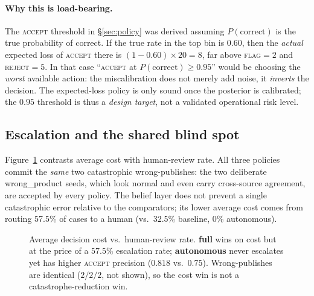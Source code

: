 \documentclass[11pt]{article}
\newcommand{\pcorrect}{P(\text{correct})}
\begin{document}
\paragraph{Why this is load-bearing.} The \textsc{accept} threshold in
\S\ref{sec:policy} was derived assuming $\pcorrect$ is the true probability of
\textsf{correct}. If the true rate in the top bin is $0.60$, then the \emph{actual}
expected loss of \textsc{accept} there is $(1-0.60)\times20 = 8$, far above
\textsc{flag}$=2$ and \textsc{reject}$=5$. In that case ``\textsc{accept} at
$\pcorrect\ge0.95$'' would be choosing the \emph{worst} available action: the
miscalibration does not merely add noise, it \emph{inverts} the decision. The
expected-loss policy is only sound once the posterior is calibrated; the $0.95$
threshold is thus a \emph{design target}, not a validated operational risk level.

\subsection{Escalation and the shared blind spot}
Figure~\ref{fig:esc} contrasts average cost with human-review rate. All three policies
commit the \emph{same} two catastrophic wrong-publishes: the two deliberate
\textsf{wrong\_product} seeds, which look normal and even carry cross-source
agreement, are accepted by every policy. The belief layer does not prevent a single
catastrophic error relative to the comparators; its lower average cost comes from
routing 57.5\% of cases to a human (vs.\ 32.5\% baseline, 0\% autonomous).

\begin{figure}[h]
\centering
{}
\caption{Average decision cost vs.\ human-review rate. \textbf{full} wins on cost but
at the price of a $57.5\%$ escalation rate; \textbf{autonomous} never escalates yet has
higher \textsc{accept} precision ($0.818$ vs.\ $0.75$). Wrong-publishes are identical
($2/2/2$, not shown), so the cost win is not a catastrophe-reduction win.}
\label{fig:esc}
\end{figure}
\end{document}
